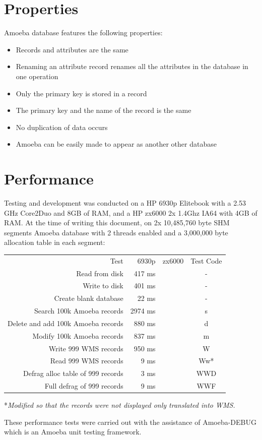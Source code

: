 \documentclass[11pt]{article}
\begin{document}
\section{Properties}
Amoeba database features the following properties:
\begin{itemize}
\item Records and attributes are the same
\item Renaming an attribute record renames all the attributes in the database in one operation
\item Only the primary key is stored in a record
\item The primary key and the name of the record is the same
\item No duplication of data occurs
\item Amoeba can be easily made to appear as another other database
\end{itemize}
\newpage
\noindent
\section{Performance}
Testing and development was conducted on a HP 6930p Elitebook with a 2.53 GHz Core2Duo and 8GB of RAM, and a HP zx6000 2x 1.4Ghz IA64 with 4GB of RAM.
\newline
\newline
At the time of writing this document, on 2x 10,485,760 byte SHM segments Amoeba database with 2 threads enabled and a 3,000,000 byte allocation table in each segment:
\newline
\begin{center}
\begin{tabular}{r || r | r || c}
\rowcolor[gray]{0.8}
Test & 6930p & zx6000 & Test Code\\
Read from disk &417 ms&&-\\
Write to disk &401 ms& &-\\
Create blank database &22 ms& &-\\
Search 100k Amoeba records &2974 ms&&s \\
Delete and add 100k Amoeba records &880 ms&&d \\
Modify 100k Amoeba records &837 ms&&m \\
Write 999 WMS records &950 ms&&W \\
Read 999 WMS records &9 ms&&Ww*\\
Defrag alloc table of 999 records&3 ms&&WWD\\
Full defrag of 999 records&9 ms&&WWF\\
\end{tabular}
\newline
\newline
*\emph{Modified so that the records were not displayed only translated into WMS.}
\end{center}
\noindent
\newline
These performance tests were carried out with the assistance of Amoeba-DEBUG which is an Amoeba unit testing framework.
\newpage
\noindent
\end{document}
